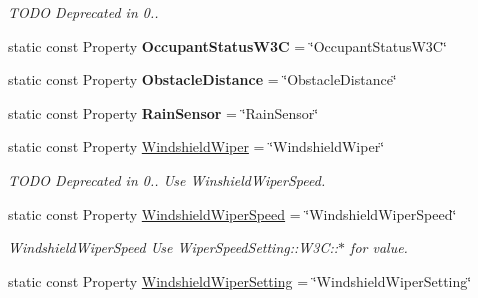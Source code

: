 \begin{DoxyCompactItemize}
\begin{DoxyCompactList}\small\item\em T\+O\+D\+O Deprecated in 0.. \end{DoxyCompactList}\item 
\hypertarget{classVehicleProperty_a27f42ba0a6c33c79b04ea2baf9b43a55}{static const Property {\bfseries Occupant\+Status\+W3\+C} = \char`\"{}Occupant\+Status\+W3\+C\char`\"{}}\label{classVehicleProperty_a27f42ba0a6c33c79b04ea2baf9b43a55}

\item 
\hypertarget{classVehicleProperty_a0b3f901f17dd92086b59a1923b9124c4}{static const Property {\bfseries Obstacle\+Distance} = \char`\"{}Obstacle\+Distance\char`\"{}}\label{classVehicleProperty_a0b3f901f17dd92086b59a1923b9124c4}

\item 
\hypertarget{classVehicleProperty_aaf332f3700a7dabc3ebe138c8442c854}{static const Property {\bfseries Rain\+Sensor} = \char`\"{}Rain\+Sensor\char`\"{}}\label{classVehicleProperty_aaf332f3700a7dabc3ebe138c8442c854}

\item 
\hypertarget{classVehicleProperty_afe911cbe3c105b89c0f5b9f0163698c8}{static const Property \hyperlink{classVehicleProperty_afe911cbe3c105b89c0f5b9f0163698c8}{Windshield\+Wiper} = \char`\"{}Windshield\+Wiper\char`\"{}}\label{classVehicleProperty_afe911cbe3c105b89c0f5b9f0163698c8}

\begin{DoxyCompactList}\small\item\em T\+O\+D\+O Deprecated in 0.. Use Winshield\+Wiper\+Speed. \end{DoxyCompactList}\item 
\hypertarget{classVehicleProperty_a00117ff074e7d12b38493455d1230b80}{static const Property \hyperlink{classVehicleProperty_a00117ff074e7d12b38493455d1230b80}{Windshield\+Wiper\+Speed} = \char`\"{}Windshield\+Wiper\+Speed\char`\"{}}\label{classVehicleProperty_a00117ff074e7d12b38493455d1230b80}

\begin{DoxyCompactList}\small\item\em Windshield\+Wiper\+Speed Use Wiper\+Speed\+Setting\+::\+W3\+C\+:\+:$\ast$ for value. \end{DoxyCompactList}\item 
\hypertarget{classVehicleProperty_aedc65affd0ac592324226b51a0d1b877}{static const Property \hyperlink{classVehicleProperty_aedc65affd0ac592324226b51a0d1b877}{Windshield\+Wiper\+Setting} = \char`\"{}Windshield\+Wiper\+Setting\char`\"{}}\label{classVehicleProperty_aedc65affd0ac592324226b51a0d1b877}


\end{DoxyCompactItemize}
